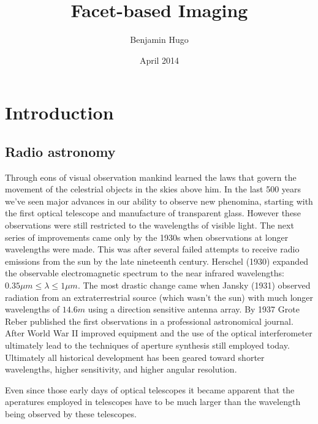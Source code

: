 \documentclass[a4paper,10pt]{report}
\title{Facet-based Imaging}
\author{Benjamin Hugo}
\date{April 2014}
\begin{document}
\maketitle

\section{Introduction}
\subsection{Radio astronomy}
Through eons of visual observation mankind learned the laws that govern the movement of the celestrial objects in the skies above him. In the last 500 years we've 
seen major advances in our ability to observe new phenomina, starting with the first optical telescope and manufacture of transparent glass. However these observations
were still restricted to the wavelengths of visible light. The next series of improvements came only by the 1930s when observations at longer wavelengths were made. This was
after several failed attempts to receive radio emissions from the sun by the late nineteenth century. Herschel (1930) expanded the observable electromagnetic spectrum to the 
near infrared wavelengths: $0.35\mu m \leq\lambda\leq 1\mu m$. The most drastic change came when Jansky (1931) observed radiation from an extraterrestrial source (which 
wasn't the sun) with much longer wavelengths of $14.6m$ using a direction sensitive antenna array. By 1937 Grote Reber published the first observations in a professional astronomical
journal. After World War II improved equipment and the use of the optical interferometer ultimately lead to the techniques of aperture synthesis still employed today. Ultimately all
historical development has been geared toward shorter wavelengths, higher sensitivity, and higher angular resolution\cite{christiansenradiotelescopes,wilson2009tools}.

Even since those early days of optical telescopes it became apparent that the aperatures employed in telescopes have to be much larger than the wavelength being observed by
these telescopes.


\end{document}
